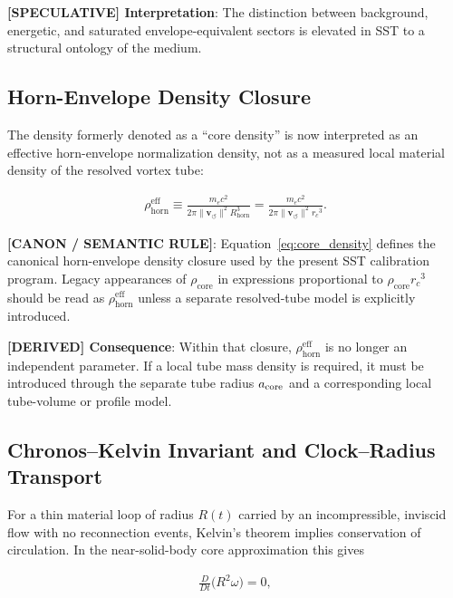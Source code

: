 \documentclass[11pt]{article}
\theoremstyle{definition}
\theoremstyle{plain}
\theoremstyle{remark}
\newcommand{\rhocore}{\rho_{\mathrm{core}}}
\newcommand{\rhohorn}{\rho_{\mathrm{horn}}^{\mathrm{eff}}}
\newcommand{\rc}{{r_c}}
\newcommand{\vnorm}{\lVert \mathbf{v}_{\!\boldsymbol{\circlearrowleft}} \rVert}
\begin{document}
        \textbf{[SPECULATIVE] Interpretation}: The distinction between background, energetic, and saturated envelope-equivalent sectors is elevated in SST to a structural ontology of the medium.
    
    \subsection{Horn-Envelope Density Closure}
        
        The density formerly denoted as a ``core density'' is now interpreted as an
        effective horn-envelope normalization density, not as a measured local
        material density of the resolved vortex tube:
        
        \begin{align}
            \rhohorn
            \equiv
            \frac{m_e c^2}{2\pi \vnorm^2 R_{\mathrm{horn}}^3}
            =
            \frac{m_e c^2}{2\pi \vnorm^2 \rc^3}.
            \label{eq:core_density}
        \end{align}
        
        \textbf{[CANON / SEMANTIC RULE]}: Equation~\eqref{eq:core_density}
        defines the canonical horn-envelope density closure used by the present
        SST calibration program. Legacy appearances of $\rhocore$ in expressions
        proportional to $\rhocore\rc^3$ should be read as $\rhohorn$ unless a
        separate resolved-tube model is explicitly introduced.

        \textbf{[DERIVED] Consequence}: Within that closure, $\rhohorn$ is no
        longer an independent parameter. If a local tube mass density is required,
        it must be introduced through the separate tube radius $a_{\rm core}$ and
        a corresponding local tube-volume or profile model.


    \subsection{Chronos--Kelvin Invariant and Clock--Radius Transport}
        \label{subsec:chronos_kelvin}

        For a thin material loop of radius $R(t)$ carried by an incompressible, inviscid flow with no reconnection events, Kelvin's theorem implies conservation of circulation. In the near-solid-body core approximation this gives

        \begin{align}
            \frac{D}{Dt}\!\bigl(R^2 \omega\bigr) = 0,
            \label{eq:chronos_kelvin_basic}
        \end{align}
\end{document}
